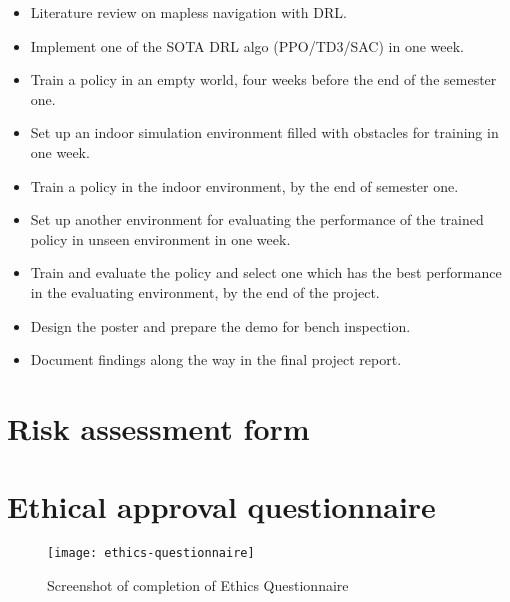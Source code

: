 \begin{itemize}
\item Literature review on mapless navigation with DRL.
\item Implement one of the SOTA DRL algo (PPO/TD3/SAC) in one week.
\item Train a policy in an empty world, four weeks before the end of the semester one.
\item Set up an indoor simulation environment filled with obstacles for training in one week.
\item Train a policy in the indoor environment, by the end of semester one.
\item Set up another environment for evaluating the performance of the trained policy in unseen environment in one week.
\item Train and evaluate the policy and select one which has the best performance in the evaluating environment, by the end of the project.
\item Design the poster and prepare the demo for bench inspection.
\item Document findings along the way in the final project report.
\end{itemize}


\section{Risk assessment form}



\section{Ethical approval questionnaire}

\begin{figure}[htbp]
   \centering
   \texttt{[image: ethics-questionnaire]}
   \caption{Screenshot of completion of Ethics Questionnaire}
   \label{fig:ethics-questionnaire}
\end{figure}

